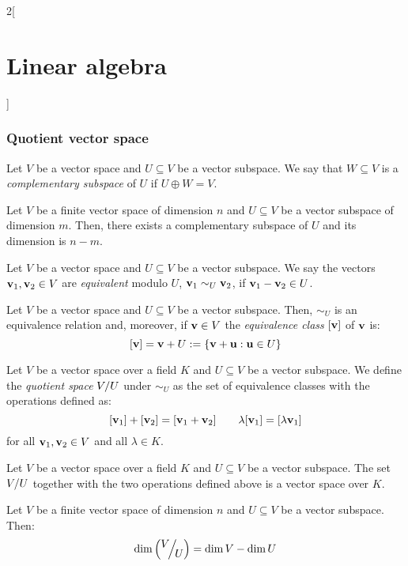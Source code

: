 \documentclass[../../../main.tex]{subfiles}
\begin{document}
\begin{multicols}{2}[\section{Linear algebra}]
  \subsubsection{Quotient vector space}
  \begin{definition}
    Let $V$ be a vector space and $U\subseteq V$ be a vector subspace. We say that $W\subseteq V$ is a \emph{complementary subspace} of $U$ if $U\oplus W=V$.
  \end{definition}
  \begin{definition}
    Let $V$ be a finite vector space of dimension $n$ and $U\subseteq V$ be a vector subspace of dimension $m$. Then, there exists a complementary subspace of $U$ and its dimension is $n-m$.
  \end{definition}
  \begin{definition}
    Let $V$ be a vector space and $U\subseteq V$ be a vector subspace. We say the vectors $\boldsymbol{\mathrm{v}}_1,\boldsymbol{\mathrm{v}}_2\in V$ are \emph{equivalent} modulo $U$, $\boldsymbol{\mathrm{v}}_1\sim_U\boldsymbol{\mathrm{v}}_2$, if $\boldsymbol{\mathrm{v}}_1-\boldsymbol{\mathrm{v}}_2\in U$.
  \end{definition}
  \begin{lemma}
    Let $V$ be a vector space and $U\subseteq V$ be a vector subspace. Then, $\sim_U$ is an equivalence relation and, moreover, if $\boldsymbol{\mathrm{v}}\in V$ the \emph{equivalence class} $[\boldsymbol{\mathrm{v}}]$ of $\boldsymbol{\mathrm{v}}$ is: $$[\boldsymbol{\mathrm{v}}]=\boldsymbol{\mathrm{v}}+U:=\{\boldsymbol{\mathrm{v}}+\boldsymbol{\mathrm{u}}:\boldsymbol{\mathrm{u}}\in U\}$$
  \end{lemma}
  \begin{definition}
    Let $V$ be a vector space over a field $K$ and $U\subseteq V$ be a vector subspace. We define the \emph{quotient space} $\quot{V}{U}$ under $\sim_U$ as the set of equivalence classes with the operations defined as:
    $$[\boldsymbol{\mathrm{v}}_1]+[\boldsymbol{\mathrm{v}}_2]=[\boldsymbol{\mathrm{v}}_1+\boldsymbol{\mathrm{v}}_2]\qquad \lambda[\boldsymbol{\mathrm{v}}_1]=[\lambda\boldsymbol{\mathrm{v}}_1]$$
    for all $\boldsymbol{\mathrm{v}}_1,\boldsymbol{\mathrm{v}}_2\in V$ and all $\lambda\in K$.
  \end{definition}
  \begin{prop}
    Let $V$ be a vector space over a field $K$ and $U\subseteq V$ be a vector subspace. The set $\quot{V}{U}$ together with the two operations defined above is a vector space over $K$.
  \end{prop}
  \begin{prop}
    Let $V$ be a finite vector space of dimension $n$ and $U\subseteq V$ be a vector subspace. Then: $$\dim\left(\quot{V}{U}\right)=\dim V-\dim U$$
  \end{prop}

\end{multicols}
\end{document}
